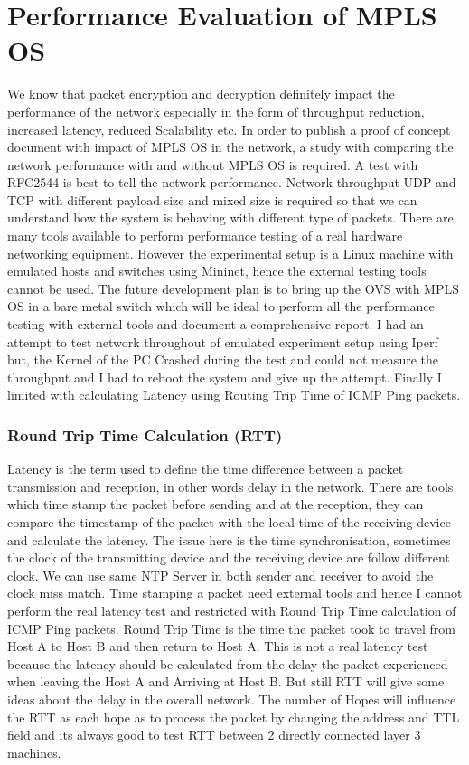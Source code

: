 \chapter{Performance Evaluation of MPLS OS }
We know that packet encryption and decryption definitely impact the performance of the network especially in the form of throughput reduction, increased latency, reduced Scalability etc. In order to publish a proof of concept document with impact of MPLS OS in the network, a study with comparing the network performance with and without MPLS OS is required. A test with RFC2544 is best to tell the network performance. Network throughput UDP and TCP with different payload size and mixed size is required so that we can understand how the system is behaving with different type of packets. There are many tools available to perform performance testing of a real hardware networking equipment. However the experimental setup is a Linux machine with emulated hosts and switches using Mininet, hence the external testing tools cannot be used. The future development plan is to bring up the OVS with MPLS OS in a bare metal switch which will be ideal to perform all the performance testing with external tools and document a comprehensive report. I had an attempt to test network throughout of emulated experiment setup using Iperf but, the Kernel of the PC Crashed during the test and could not measure the throughput and I had to reboot the system and give up the attempt. Finally I limited with calculating Latency using Routing Trip Time of ICMP Ping packets.

\subsection{Round Trip Time Calculation (RTT)}

Latency is the term used to define the time difference between a packet transmission and reception, in other words delay in the network. There are tools which time stamp the packet before sending and at the reception, they can compare the timestamp of the packet with the local time of the receiving device and calculate the latency. The issue here is the time synchronisation, sometimes the clock of the transmitting device and the receiving device are follow different clock. We can use same NTP Server in both sender and receiver to avoid the clock miss match. Time stamping a packet need external tools and hence I cannot perform the real latency test and restricted with Round Trip Time calculation of ICMP Ping packets. Round Trip Time is the time the packet took to travel from Host A to Host B and then return to Host A. This is not a real latency test because the latency should be calculated from the delay the packet experienced when leaving the Host A and Arriving at Host B. But still RTT will give some ideas about the delay in the overall network. The number of Hopes will influence the RTT as each hope as to process the packet by changing the address and TTL field and its always good to test RTT between 2 directly connected layer 3 machines.\\

